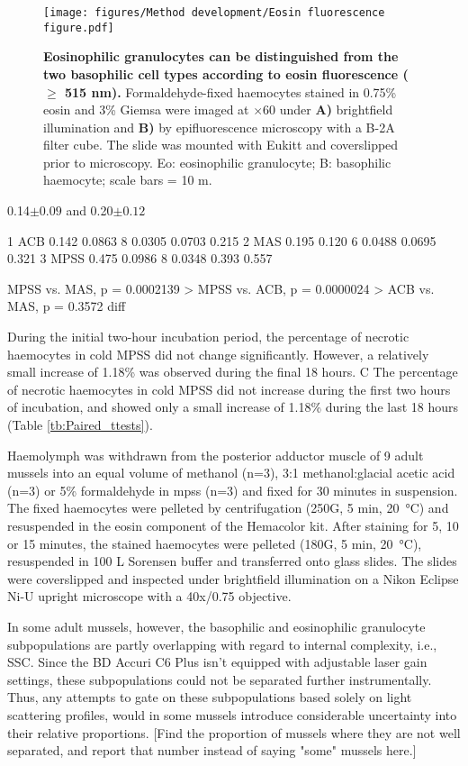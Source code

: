 \begin{figure}[!ht]
    \centering
    \texttt{[image: figures/Method development/Eosin fluorescence figure.pdf]}
    \caption{\textbf{Eosinophilic granulocytes can be distinguished from the two basophilic cell types according to eosin fluorescence ($\geq$ 515 nm).} Formaldehyde-fixed haemocytes stained in 0.75\% eosin and 3\% Giemsa were imaged at $\times$60 under \textbf{A)} brightfield illumination and \textbf{B)} by epifluorescence microscopy with a B-2A filter cube. The slide was mounted with Eukitt\textsuperscript{\textregistered} and coverslipped prior to microscopy. Eo: eosinophilic granulocyte; B: basophilic haemocyte; scale bars = 10 \micro m. }
    \label{fig:reserve}
\end{figure}

0.14$\pm{0.09}$ and  0.20$\pm{0.12}$


1 ACB    0.142  0.0863   8   0.0305   0.0703    0.215
2 MAS    0.195  0.120    6   0.0488   0.0695    0.321
3 MPSS   0.475  0.0986   8   0.0348   0.393     0.557

MPSS vs. MAS, p = 0.0002139 >
MPSS vs. ACB, p = 0.0000024 >
ACB vs.  MAS, p = 0.3572    diff

During the initial two-hour incubation period, the percentage of necrotic haemocytes in cold MPSS did not change significantly. However, a relatively small increase of 1.18\% was observed during the final 18 hours. C
The percentage of necrotic haemocytes in cold MPSS did not increase during the first two hours of incubation, and showed only a small increase of 1.18\% during the last 18 hours (Table \ref{tb:Paired_ttests}).


Haemolymph was withdrawn from the posterior adductor muscle of 9 adult mussels into an equal volume of methanol (n=3), 3:1 methanol:glacial acetic acid (n=3) or 5\% formaldehyde in \acrshort{mpss} (n=3) and fixed for 30 minutes in suspension. The fixed haemocytes were pelleted by centrifugation (250G, 5 min, \SI{20}{\celsius}) and resuspended in the eosin component of the Hemacolor\textsuperscript{\textregistered} kit. After staining for 5, 10 or 15 minutes, the stained haemocytes were pelleted (180G, 5 min, \SI{20}{\celsius}), resuspended in 100 \micro L Sorensen buffer and transferred onto glass slides. The slides were coverslipped and inspected under brightfield illumination on a Nikon Eclipse Ni-U upright microscope with a 40x/0.75 objective.

In some adult mussels, however, the basophilic and eosinophilic granulocyte subpopulations are partly overlapping with regard to internal complexity, i.e., SSC. Since the BD Accuri C6 Plus isn't equipped with adjustable laser gain settings, these subpopulations could not be separated further instrumentally. Thus, any attempts to gate on these subpopulations based solely on light scattering profiles, would in some mussels introduce considerable uncertainty into their relative proportions. [Find the proportion of mussels where they are not well separated, and report that number instead of saying "some" mussels here.]

